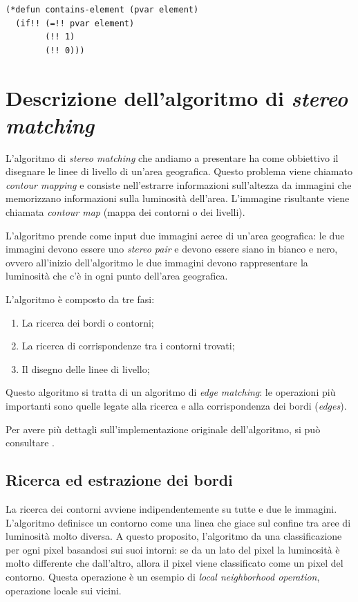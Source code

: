 \documentclass[12pt,a4paper,openright,twoside]{report}
\begin{document}
\begin{lstlisting}[caption={Esempio di codice *Lisp. Questa versione della funzione implementa la ricerca in parallelo su tutti gli elementi dell'array.}]
(*defun contains-element (pvar element)
  (if!! (=!! pvar element)
        (!! 1)
        (!! 0)))
\end{lstlisting}

\chapter{Descrizione dell'algoritmo di \textit{stereo matching}}

L'algoritmo di \textit{stereo matching} che andiamo a presentare ha come obbiettivo il disegnare le linee di livello di un'area geografica. Questo problema viene chiamato \textit{contour mapping} e consiste nell'estrarre informazioni sull'altezza da immagini che memorizzano informazioni sulla luminosità dell'area. L'immagine risultante viene chiamata \textit{contour map} (mappa dei contorni o dei livelli).

L'algoritmo prende come input due immagini aeree di un'area geografica: le due immagini devono essere uno \textit{stereo pair} e devono essere siano in bianco e nero, ovvero all'inizio dell'algoritmo le due immagini devono rappresentare la luminosità che c'è in ogni punto dell'area geografica.

L'algoritmo è composto da tre fasi:

\begin{enumerate}
    \item La ricerca dei bordi o contorni;
    \item La ricerca di corrispondenze tra i contorni trovati;
    \item Il disegno delle linee di livello;
\end{enumerate}

Questo algoritmo si tratta di un algoritmo di \textit{edge matching}: le operazioni più importanti sono quelle legate alla ricerca e alla corrispondenza dei bordi (\textit{edges}).

Per avere più dettagli sull'implementazione originale dell'algoritmo, si può consultare \cite{originalalgo}.

\section{Ricerca ed estrazione dei bordi}

La ricerca dei contorni avviene indipendentemente su tutte e due le immagini. L'algoritmo definisce un contorno come una linea che giace sul confine tra aree di luminosità molto diversa. A questo proposito, l'algoritmo da una classificazione per ogni pixel basandosi sui suoi intorni: se da un lato del pixel la luminosità è molto differente che dall'altro, allora il pixel viene classificato come un pixel del contorno. Questa operazione è un esempio di \textit{local neighborhood operation}, operazione locale sui vicini.
\end{document}
